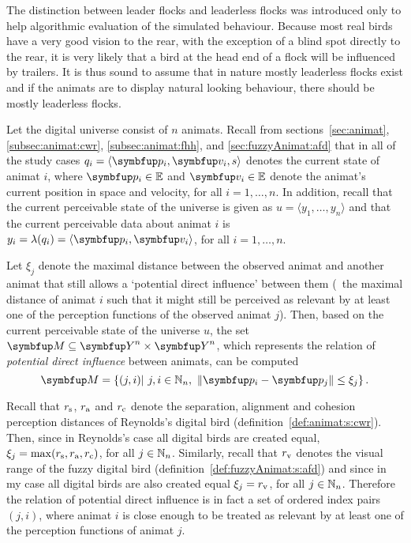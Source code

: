 The distinction between leader flocks and leaderless flocks was introduced only to help algorithmic evaluation of the simulated behaviour. Because most real birds have a very good vision to the rear, with the exception of a blind spot directly to the rear, it is very likely that a bird at the head end of a flock will be influenced by trailers. It is thus sound to assume that in nature mostly leaderless flocks exist and if the animats are to display natural looking behaviour, there should be mostly leaderless flocks.

Let the digital universe consist of $n$ animats. Recall from sections~\ref{sec:animat}, \ref{subsec:animat:cwr}, \ref{subsec:animat:fhh}, and \ref{sec:fuzzyAnimat:afd} that in all of the study cases $q_i=\langle \vect{p}_i, \vect{v}_i, s \rangle$ denotes the current state of animat $i$, where $\vect{p}_i \in \E$ and $\vect{v}_i \in \E$ denote the animat's current position in space and velocity, for all $i=1,\ldots,n$. In addition, recall that the current perceivable state of the universe is given as $u=\langle y_1,\ldots,y_n\rangle$ and that the current perceivable data about animat $i$ is $y_i=\lambda(q_i)=\langle\vect{p}_i,\vect{v}_i\rangle$, for all $i=1,\ldots,n$. 

Let $\xi_j$ denote the maximal distance between the observed animat and another animat that still allows a `potential direct influence' between them (\ie\ the maximal distance of animat $i$ such that it might still be perceived as relevant by at least one of the perception functions of the observed animat $j$). Then, based on the current perceivable state of the universe $u$, the set $\set{M} \subseteq \set{Y}^n \times \set{Y}^n$, which represents the relation of \emph{potential direct influence} between animats, can be computed
%
\begin{equation}
	\set{M}=\left\{ (j,i)|\ j, i \in \N_n,\ \left\|\vect{p}_i-\vect{p}_j\right\| \leq \xi_j \right\}. \label{eq:metric:M}
\end{equation}

Recall that $r_\textnormal{s}$, $r_\textnormal{a}$ and $r_\textnormal{c}$ denote the separation, alignment and cohesion perception distances of Reynolds's digital bird (definition~\ref{def:animat:s:cwr}). Then, since in Reynolds's case all digital birds are created equal, $\xi_j=\max(r_\textnormal{s},r_\textnormal{a},r_\textnormal{c})$, for all $j \in \mathbb{N}_n$. Similarly, recall that $r_\textnormal{v}$ denotes the visual range of the fuzzy digital bird (definition~\ref{def:fuzzyAnimat:s:afd}) and since in my case all digital birds are also created equal $\xi_j=r_\textnormal{v}$, for all $j \in \mathbb{N}_n$. Therefore the relation of potential direct influence is in fact a set of ordered index pairs $(j,i)$, where animat $i$ is close enough to be treated as relevant by at least one of the perception functions of animat $j$. 

